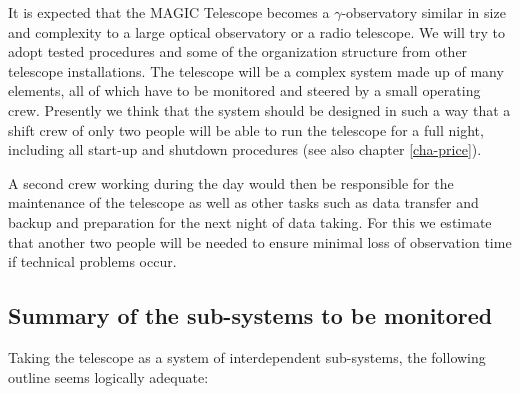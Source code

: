 
\medskip It is expected that the MAGIC Telescope becomes a $\gamma $-observatory similar
in size and complexity to a large optical observatory or a radio telescope.
We will try to adopt tested procedures and some of the organization
structure from other telescope installations. The telescope will be a
complex system made up of many elements, all of which have to be monitored
and steered by a small operating crew. Presently we think that the system
should be designed in such a way that a shift crew of only two people will
be able to run the telescope for a full night, including all start-up and
shutdown procedures (see also chapter \ref{cha-price}).

A second crew working during the day would then be responsible for the
maintenance of the telescope as well as other tasks such as data transfer
and backup and preparation for the next night of data taking. For this we
estimate that another two people will be needed to ensure minimal loss of
observation time if technical problems occur.

\subsection{Summary of the sub-systems to be monitored}

Taking the telescope as a system of interdependent sub-systems, the
following outline seems logically adequate:

